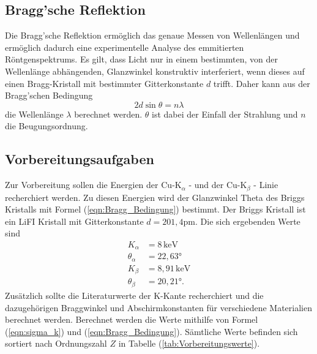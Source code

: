 \subsection{Bragg'sche Reflektion}
Die Bragg'sche Reflektion ermöglich das genaue Messen von Wellenlängen und ermöglich dadurch eine experimentelle Analyse des emmitierten Röntgenspektrums. Es gilt, 
dass Licht nur in einem bestimmten, von der Wellenlänge abhängenden, Glanzwinkel konstruktiv interferiert, wenn dieses auf einen Bragg-Kristall mit bestimmter Gitterkonstante
$d$ trifft. Daher kann aus der Bragg'schen Bedingung 
\begin{equation}
    \label{eqn:Bragg_Bedingung}
    2 d \sin{\theta} = n \lambda
\end{equation}
die Wellenlänge $\lambda$ berechnet werden. $\theta$ ist dabei der Einfall der Strahlung und $n$ die Beugungsordnung.

\subsection{Vorbereitungsaufgaben}
\label{sec:Vorbereitungsaufgaben}
Zur Vorbereitung sollen die Energien der $\text{Cu-K}_\alpha$ - und der $\text{Cu-K}_{\beta}$ - Linie recherchiert werden. Zu diesen Energien wird der Glanzwinkel 
Theta des Briggs Kristalls mit Formel (\ref{eqn:Bragg_Bedingung}) bestimmt. Der Briggs Kristall ist ein LiFI Kristall mit Gitterkonstante $d = 201,4 \unit{\pico\meter}$.
Die sich ergebenden Werte sind 
\begin{align*}
    K_\alpha &= 8 \, \si{\kilo\electronvolt}\\
    \theta_\alpha &= 22,63 \unit{\degree} \\
    K_\beta &= 8,91 \, \si{\kilo\electronvolt}\\
    \theta_\beta &= 20,21 \unit{\degree} .
\end{align*}
Zusätzlich sollte die Literaturwerte der K-Kante recherchiert und die dazugehörigen Braggwinkel und Abschirmkonstanten für verschiedene Materialien berechnet werden.
Berechnet werden die Werte mithilfe von Formel (\ref{eqn:sigma_k}) und (\ref{eqn:Bragg_Bedingung}).
Sämtliche Werte befinden sich sortiert nach Ordnungszahl $Z$ in Tabelle (\ref{tab:Vorbereitungswerte}).


